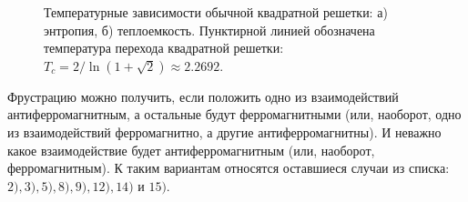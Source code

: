 \documentclass[utf8,12pt]{jetp}
\begin{document}
\begin{figure}[h]
	\begin{minipage}[h]{0.5\linewidth}
	\end{minipage}
	\hfill
	\begin{minipage}[h]{0.5\linewidth}
	\end{minipage}
	\caption{Температурные зависимости обычной квадратной решетки: а) энтропия, б) теплоемкость. Пунктирной линией обозначена температура перехода квадратной решетки: $T_c = 2/\ln(1+\sqrt{2})\approx 2.2692$.}
	\label{SimpleSquareLattice}
\end{figure}

Фрустрацию можно получить, если положить одно из взаимодействий антиферромагнитным, а остальные будут ферромагнитными (или, наоборот, одно из взаимодействий ферромагнитно, а другие антиферромагнитны). И неважно какое взаимодействие будет антиферромагнитным (или, наоборот, ферромагнитным). К таким вариантам относятся оставшиеся случаи из списка: $2), 3), 5), 8), 9), 12), 14)$ и $15)$.
\end{document}

